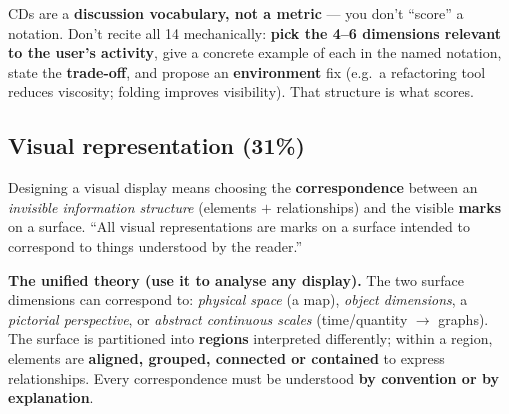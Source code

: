 \documentclass[11pt,a4paper]{article}
\begin{document}
\begin{gotcha}
CDs are a \textbf{discussion vocabulary, not a metric} --- you don't ``score'' a notation. Don't recite all 14 mechanically: \textbf{pick the 4--6 dimensions relevant to the user's activity}, give a concrete example of each in the named notation, state the \textbf{trade-off}, and propose an \textbf{environment} fix (e.g.\ a refactoring tool reduces viscosity; folding improves visibility). That structure is what scores.
\end{gotcha}

\subsection{Visual representation (31\%)}

\begin{must}
Designing a visual display means choosing the \textbf{correspondence} between an \emph{invisible information structure} (elements $+$ relationships) and the visible \textbf{marks} on a surface. ``All visual representations are marks on a surface intended to correspond to things understood by the reader.''
\end{must}

\begin{useful}
\textbf{The unified theory (use it to analyse any display).} The two surface dimensions can correspond to: \emph{physical space} (a map), \emph{object dimensions}, a \emph{pictorial perspective}, or \emph{abstract continuous scales} (time/quantity $\to$ graphs). The surface is partitioned into \textbf{regions} interpreted differently; within a region, elements are \textbf{aligned, grouped, connected or contained} to express relationships. Every correspondence must be understood \textbf{by convention or by explanation}.
\end{useful}
\end{document}

